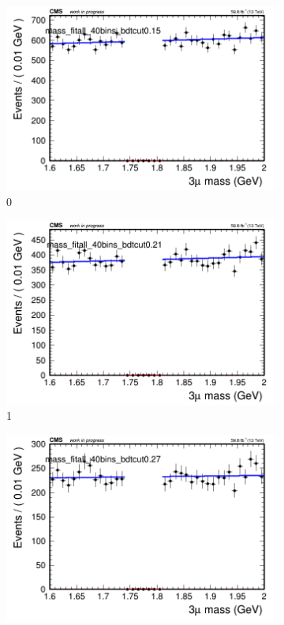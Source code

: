 \begin{figure}[h!]
    \centering
    \begin{subfigure}{0.2\textwidth}
        \includegraphics[width=\textwidth]{unfixed_exp/plots/all/massfit_all_40bins_bdtcut0.15.png}
        \caption{0}
    \end{subfigure}
    \begin{subfigure}{0.2\textwidth}
        \includegraphics[width=\textwidth]{unfixed_exp/plots/all/massfit_all_40bins_bdtcut0.21.png}
        \caption{1}
    \end{subfigure}
    \begin{subfigure}{0.2\textwidth}
        \includegraphics[width=\textwidth]{unfixed_exp/plots/all/massfit_all_40bins_bdtcut0.27.png}

\end{subfigure}
\end{figure}
